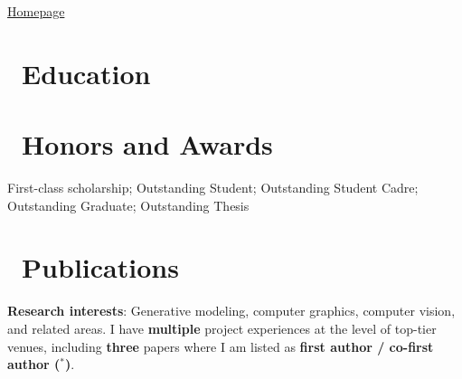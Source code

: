\documentclass{resume}
\begin{document}
\vspace{-10ex}

\vspace{1ex}
{\href{https://cv.jream.top/}{Homepage}}

\vspace{-1ex}

\section{\faGraduationCap\ Education}


{ }
\vspace{1ex}

\section{\faTrophy\ Honors and Awards}
First-class scholarship; Outstanding Student; Outstanding Student Cadre; Outstanding Graduate; Outstanding Thesis

\section{\faSitemap\ Publications}
  \textbf{Research interests}: Generative modeling, computer graphics, computer vision, and related areas. I have \textbf{multiple} project experiences at the level of top-tier venues, including \textbf{three} papers where I am listed as \textbf{first author / co-first author ($^{*}$)}.
  \midrule
\end{document}
